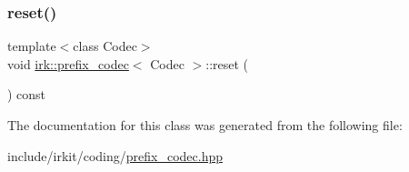 \subsubsection{\texorpdfstring{reset()}{reset()}}
{\footnotesize\ttfamily template$<$class Codec$>$ \\
void \mbox{\hyperlink{classirk_1_1prefix__codec}{irk\+::prefix\+\_\+codec}}$<$ Codec $>$\+::reset (\begin{DoxyParamCaption}{ }\end{DoxyParamCaption}) const\hspace{0.3cm}{\ttfamily [inline]}}



The documentation for this class was generated from the following file\+:\begin{DoxyCompactItemize}
\item 
include/irkit/coding/\mbox{\hyperlink{prefix__codec_8hpp}{prefix\+\_\+codec.\+hpp}}\end{DoxyCompactItemize}
